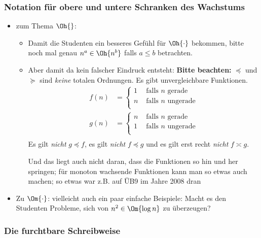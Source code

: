 \documentclass[12pt]{article}
\theoremstyle{margin}
\theoremstyle{margin}
\begin{document}
\subsubsection{Notation f\"ur obere und untere Schranken des Wachstums}

\begin{itemize}
 \item zum Thema $\Oh{}$:
  \begin{itemize}
  \item Damit die Studenten ein besseres Gef\"uhl f\"ur $\Oh{\cdot}$
    bekommen, bitte noch mal genau $n^a\in \Oh{n^b}$ falls $a\leq b$
    betrachten.
  \item Aber damit da kein falscher Eindruck entsteht: \textbf{Bitte
      beachten:} $\preceq$ und $\succeq$ sind \emph{keine} totalen
    Ordnungen. Es gibt unvergleichbare Funktionen. \ZB
    \begin{align*}
      f(n) &=
      \begin{cases}
        1 & \text{ falls $n$ gerade} \\
        n & \text{ falls $n$ ungerade} \\
      \end{cases} \\
      g(n) &=
      \begin{cases}
        n & \text{ falls $n$ gerade} \\
        1 & \text{ falls $n$ ungerade} \\
      \end{cases} \\
    \end{align*}
    Es gilt \emph{nicht} $g\preceq f$, es gilt \emph{nicht} $f\preceq
    g$ und es gilt erst recht \emph{nicht} $f\asymp g$.

    Und das liegt auch nicht daran, dass die Funktionen so hin und her
    springen; f\"ur monoton wachsende Funktionen kann man so etwas auch
    machen; so etwas war z.B. auf \"UB9 im Jahre 2008 dran
  \end{itemize}

\item  Zu $\Om{\cdot}$: vielleicht auch ein paar einfache Beispiele: Macht
  es den Studenten Probleme, sich von $n^2\in\Om{\log n}$ zu
  \"uberzeugen?
\end{itemize}

\subsubsection{Die furchtbare Schreibweise}
\end{document}

